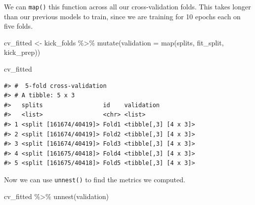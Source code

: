 \documentclass[
]{krantz}
\makeatletter
\newenvironment{Shaded}{\begin{snugshade}}{\end{snugshade}}
\newcommand{\AttributeTok}[1]{\textcolor[rgb]{0.77,0.63,0.00}{#1}}
\newcommand{\FunctionTok}[1]{\textcolor[rgb]{0.00,0.00,0.00}{#1}}
\newcommand{\NormalTok}[1]{#1}
\newcommand{\OtherTok}[1]{\textcolor[rgb]{0.56,0.35,0.01}{#1}}
\newcommand{\SpecialCharTok}[1]{\textcolor[rgb]{0.00,0.00,0.00}{#1}}
\newenvironment{kframe}{%
\medskip{}
\setlength{\fboxsep}{.8em}
 \def\at@end@of@kframe{}%
 \ifinner\ifhmode%
  \def\at@end@of@kframe{\end{minipage}}%
  \begin{minipage}{\columnwidth}%
 \fi\fi%
 \def\FrameCommand##1{\hskip\@totalleftmargin \hskip-\fboxsep
 \colorbox{shadecolor}{##1}\hskip-\fboxsep
     \hskip-\linewidth \hskip-\@totalleftmargin \hskip\columnwidth}%
 \MakeFramed {\advance\hsize-\width
   \@totalleftmargin\z@ \linewidth\hsize
   \@setminipage}}%
 {\par\unskip\endMakeFramed%
 \at@end@of@kframe}
\renewenvironment{Shaded}{\begin{kframe}}{\end{kframe}}
\makeatother
\begin{document}
We can \texttt{map()} this function across all our cross-validation folds. This takes longer than our previous models to train, since we are training for 10 epochs each on five folds.

\begin{Shaded}
\begin{Highlighting}[]
\NormalTok{cv\_fitted }\OtherTok{\textless{}{-}}\NormalTok{ kick\_folds }\SpecialCharTok{\%\textgreater{}\%}
  \FunctionTok{mutate}\NormalTok{(}\AttributeTok{validation =} \FunctionTok{map}\NormalTok{(splits, fit\_split, kick\_prep))}

\NormalTok{cv\_fitted}
\end{Highlighting}
\end{Shaded}

\begin{verbatim}
#> #  5-fold cross-validation 
#> # A tibble: 5 x 3
#>   splits                 id    validation          
#>   <list>                 <chr> <list>              
#> 1 <split [161674/40419]> Fold1 <tibble[,3] [4 x 3]>
#> 2 <split [161674/40419]> Fold2 <tibble[,3] [4 x 3]>
#> 3 <split [161674/40419]> Fold3 <tibble[,3] [4 x 3]>
#> 4 <split [161675/40418]> Fold4 <tibble[,3] [4 x 3]>
#> 5 <split [161675/40418]> Fold5 <tibble[,3] [4 x 3]>
\end{verbatim}

Now we can use \texttt{unnest()} to find the metrics we computed.

\begin{Shaded}
\begin{Highlighting}[]
\NormalTok{cv\_fitted }\SpecialCharTok{\%\textgreater{}\%}
  \FunctionTok{unnest}\NormalTok{(validation)}
\end{Highlighting}
\end{Shaded}
\end{document}
